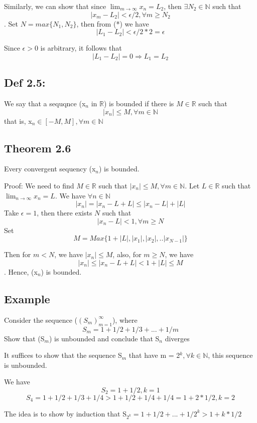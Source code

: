 \documentclass[12pt, a4paper]{ctexart}
\begin{document}
Similarly, we can show that since $\lim_{m \rightarrow \infty}x_{n} =
L_{2}$, then $\exists N_{2} \in \mathbb{N}$ such that \[|x_{m} - L_{2}|
  < \epsilon/2, \forall m \ge N_{2}\].
Set $N = max\{N_{1}, N_{2}\}$, then from (*) we have \[|L_{1} - L_{2}|
  < \epsilon/2 * 2 = \epsilon\]

Since $\epsilon > 0 $ is arbitrary, it follows that \[|L_{1} - L_{2}| =
  0 \Rightarrow L_{1} = L_{2}\]

\subsection{Def 2.5: }
We say that a sequqnce (x$_{n} \text{ in } \mathbb{R}$) is bounded if there is
$M \in \mathbb{R}$ such that
\[|x_{n}| \le M, \forall m \in \mathbb{N}\]
that is, x$_{n} \in [-M, M], \forall m \in \mathbb{N}$

\subsection{Theorem 2.6}
Every convergent sequency (x$_{n}$) is bounded.

Proof: We need to find $M \in \mathbb{R}$ such that $|x_{n}|\le M,
\forall m \in \mathbb{N}$. Let $L \in \mathbb{R}$ such that $\lim_{n
  \rightarrow \infty} x_{n} = L$. We have $\forall n \in \mathbb{N}$
\[ |x_{n}| = |x_{n} - L + L| \le |x_{n} - L| + |L|\]
Take $\epsilon = 1$, then there exists $N$ such that
\[|x_{n} - L| < 1, \forall m \ge N\]
Set \[M = Max\{1 + |L|, |x_{1}|, |x_{2}|, .. |x_{N - 1}| \}\]

Then for $m < N$, we have $|x_{n}| \le M$, also, for $m \ge N$, we
have \[|x_{n}| \le |x_{n} - L + L| < 1 + |L| \le M\]. Hence, (x$_{n}$)
is bounded.

\subsection{Example}
Consider the sequence ($(S_{m})_{m = 1}^{\infty}$), where
\[ S_{m} = 1  + 1/2  + 1/3 + ... + 1/m\]
Show that (S$_{m}$) is unbounded and conclude that S$_{n}$ diverges

It suffices to show that the sequence S$_{m}$ that have m =
2$^{k}, \forall k \in \mathbb{N}$, this sequence is unbounded.

We have
\[ S_{2} = 1 + 1/2, k = 1 \]
\[ S_{4} = 1 + 1/2 + 1/3 + 1/4 > 1 + 1/2 + 1/4 + 1/4 = 1 + 2 * 1/2, k
  =2\]

The idea is to show by induction that S$_{2^{k}} = 1 + 1/2 + ... +
1/2^{k} > 1 + k * 1/2$

    
\end{document}
